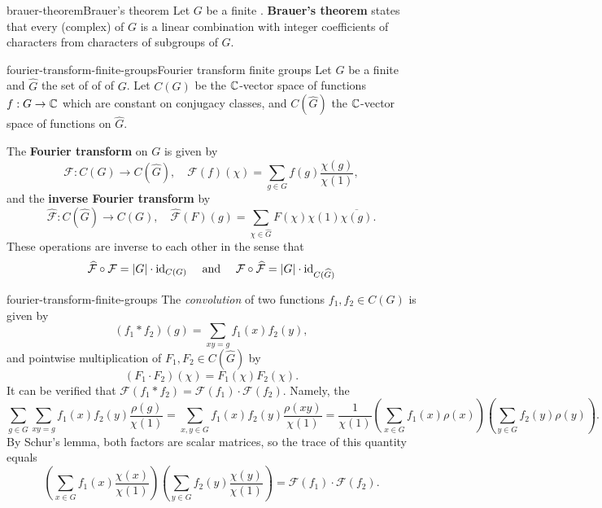 \begin{topic}{brauer-theorem}{Brauer's theorem}
    Let $G$ be a finite . \textbf{Brauer's theorem} states that every (complex)  of $G$ is a linear combination with integer coefficients of characters  from characters of  subgroups of $G$.
\end{topic}

\begin{topic}{fourier-transform-finite-groups}{Fourier transform finite groups}
    Let $G$ be a finite  and $\widehat{G}$ the set of  of  of $G$. Let $C(G)$ be the $\mathbb{C}$-vector space of functions $f : G \to \mathbb{C}$ which are constant on conjugacy classes, and $C(\widehat{G})$ the $\mathbb{C}$-vector space of functions on $\widehat{G}$.
    
    The \textbf{Fourier transform} on $G$ is given by
    \[ \mathcal{F} : C(G) \to C(\widehat{G}), \quad \mathcal{F}(f)(\chi) = \sum_{g \in G} f(g) \frac{\chi(g)}{\chi(1)} , \]
    and the \textbf{inverse Fourier transform} by
    \[ \widehat{\mathcal{F}} : C(\widehat{G}) \to C(G), \quad \widehat{\mathcal{F}}(F)(g) = \sum_{\chi \in \widehat{G}} F(\chi) \chi(1) \overline{\chi(g)} . \]
    These operations are inverse to each other in the sense that
    \[ \widehat{\mathcal{F}} \circ \mathcal{F} = |G| \cdot \textup{id}_{C(G)} \quad \textup{ and } \quad \mathcal{F} \circ \widehat{\mathcal{F}} = |G| \cdot \textup{id}_{C(\widehat{G})} \]
\end{topic}

\begin{example}{fourier-transform-finite-groups}
    The \textit{convolution} of two functions $f_1, f_2 \in C(G)$ is given by
    \[ (f_1 * f_2)(g) = \sum_{xy = g} f_1(x) f_2(y) , \]
    and pointwise multiplication of $F_1, F_2 \in C(\widehat{G})$ by
    \[ (F_1 \cdot F_2)(\chi) = F_1(\chi) F_2(\chi) . \]
    It can be verified that $\mathcal{F}(f_1 * f_2) = \mathcal{F}(f_1) \cdot \mathcal{F}(f_2)$. Namely, the
    \[ \sum_{g \in G} \sum_{xy = g} f_1(x) f_2(y) \frac{\rho(g)}{\chi(1)} = \sum_{x, y \in G} f_1(x) f_2(y) \frac{\rho(xy)}{\chi(1)} = \frac{1}{\chi(1)} \left( \sum_{x \in G} f_1(x) \rho(x) \right) \left( \sum_{y \in G} f_2(y) \rho(y) \right) . \]
    By Schur's lemma, both factors are scalar matrices, so the trace of this quantity equals
    \[ \left( \sum_{x \in G} f_1(x) \frac{\chi(x)}{\chi(1)} \right) \left( \sum_{y \in G} f_2(y) \frac{\chi(y)}{\chi(1)} \right) = \mathcal{F}(f_1) \cdot \mathcal{F}(f_2) . \]
\end{example}


